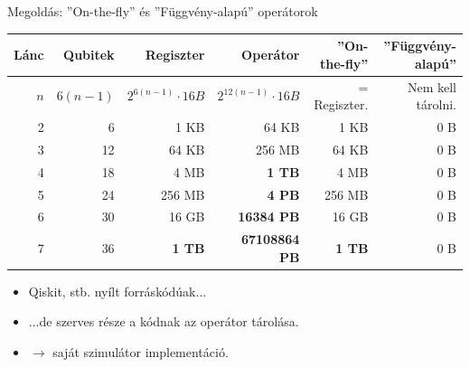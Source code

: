 \documentclass[aspectratio=169]{beamer}
\begin{document}
\begin{frame}[t]{Megoldás: ''On-the-fly'' és ''Függvény-alapú'' operátorok}
\vspace{2mm}
\begin{tabular}{r|r|r|r|r|r}
Lánc & Qubitek & Regiszter & Operátor &  \cellcolor{applegreen!30} ''On-the-fly'' &  \cellcolor{applegreen!30} ''Függvény-alapú'' \\
\hline
\rule{0pt}{1.05\normalbaselineskip} $n$ & $6(n-1)$ & $2^{6(n-1)} \cdot{} 16 B$ & ${2^{12(n-1)}} \cdot{} 16 B$ &  = Regiszter. &   Nem kell tárolni. \\
\hline
2 & 6 &  1 KB &  64 KB &  1 KB & 0 B \\
3 & 12 &  64 KB &  256 MB &  64 KB & 0 B \\
4 & 18 &  4 MB & \color{red} \textbf{1 TB} &  4 MB & 0 B  \\
5 & 24 &  256 MB & \color{red} \textbf{4 PB} &  256 MB & 0 B \\
6 & 30 &  16 GB & \color{red} \textbf{16384 PB} &  16 GB & 0 B\\
7 & 36 & \color{red} \textbf{1 TB} & \color{red} \textbf{67108864 PB} & \color{red} \textbf{1 TB} & 0 B
\end{tabular}
\pause
\vspace{2mm}
\begin{itemize}
    \item Qiskit, stb. nyílt forráskódúak...
    \item ...de szerves része a kódnak az operátor tárolása.
    \item $\rightarrow$ saját szimulátor implementáció.
\end{itemize}

\end{frame}
\end{document}
